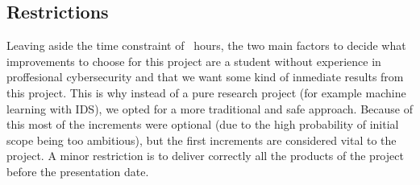 \subsection{Restrictions}
Leaving aside the time constraint of \projecthours \ hours, the two main factors to decide what improvements to choose for this project are a student without experience in proffesional cybersecurity and that we want some kind of inmediate results from this project.
This is why instead of a pure research project (for example machine learning with IDS), we opted for a more traditional and safe approach.
Because of this most of the increments were optional (due to the high probability of initial scope being too ambitious), but the first increments are considered vital to the project.
\linej
\linej
A minor restriction is to deliver correctly all the products of the project before the presentation date.

